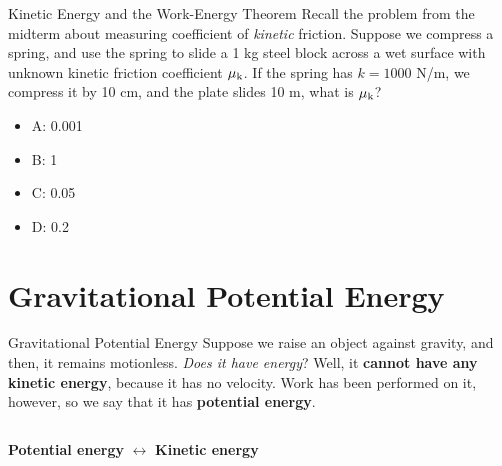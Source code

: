 \documentclass{beamer}
\begin{document}

\begin{frame}{Kinetic Energy and the Work-Energy Theorem}
Recall the problem from the midterm about measuring coefficient of \textit{kinetic} friction.  Suppose we compress a spring, and use the spring to slide a 1 kg steel block across a wet surface with unknown kinetic friction coefficient $\mu_{\rm k}$.  If the spring has $k=1000$ N/m, we compress it by 10 cm, and the plate slides 10 m, what is $\mu_{\rm k}$?
\begin{itemize}
\item A: 0.001
\item B: 1
\item C: 0.05
\item D: 0.2 
\end{itemize}
\end{frame}

\section{Gravitational Potential Energy}

\begin{frame}{Gravitational Potential Energy}
Suppose we raise an object against gravity, and then, it remains motionless.  \textit{Does it have energy}?  Well, it \textbf{cannot have any kinetic energy}, because it has no velocity.  Work has been performed on it, however, so we say that it has \textbf{potential energy}. \\ \vspace{1cm}
\begin{columns}[T]
\begin{column}{0.8\textwidth}
\centering
\textbf{\alert{Potential energy}} $\leftrightarrow$ \textbf{\alert{Kinetic energy}}
\end{column}
\end{columns}
\end{frame}
\end{document}
